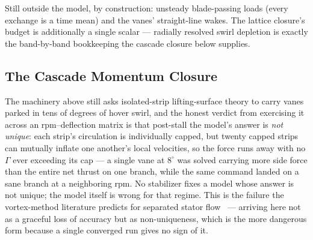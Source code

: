 \documentclass[]{aiaa-tc}%
\begin{document}
Still outside the model, by construction: unsteady blade-passing loads
(every exchange is a time mean) and the vanes' straight-line wakes.
The lattice closure's budget is additionally a single scalar ---
radially resolved swirl depletion is exactly the band-by-band
bookkeeping the cascade closure below supplies.

\subsection{The Cascade Momentum Closure}
\label{s:cascade}

The machinery above still asks isolated-strip lifting-surface theory
to carry vanes parked in tens of degrees of hover swirl, and the
honest verdict from exercising it across an rpm--deflection matrix is
that post-stall the model's answer is \emph{not unique}: each strip's
circulation is individually capped, but twenty capped strips can
mutually inflate one another's local velocities, so the force runs
away with no $\Gamma$ ever exceeding its cap --- a single vane at
$8^\circ$ was solved carrying more side force than the entire net
thrust on one branch, while the same command landed on a sane branch
at a neighboring rpm. No stabilizer fixes a model whose answer is not
unique; the model itself is wrong for that regime. This is the
failure the vortex-method literature predicts for separated stator
flow~\cite{lee2022} --- arriving here not as a graceful loss of
accuracy but as non-uniqueness, which is the more dangerous form
because a single converged run gives no sign of it.
\end{document}
